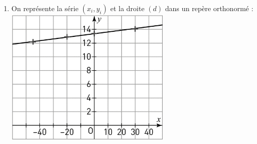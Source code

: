 \documentclass[a4paper,11pt,exos]{nsi} %
\begin{document}
{\begin{enumerate}
        \begin{tabbing}
            $m$\= $=\dfrac{\mathrm{Cov}(x,y)}{\mathrm{Var}(x)}$\\
            \> $=\dfrac{19,0625}{754,6875}$\\
            \> $\approx 0,025$
        \end{tabbing}
        Donc l'équation de la droite $(d)$ d'ajustement affine de la série $(x_i,y_i)$ est :
        \begin{tabbing}
            $y$\= $\approx 0,025(x+8,75)+13,15$\\
            \> $\approx 0,025x+0,21875+13,15$\\
            \> $\approx 0,025x+13,37$
        \end{tabbing}
        \item On représente la série $(x_i,y_i)$ et la droite $(d)$ dans un repère orthonormé :\\[.5em]
        \includegraphics[width=8cm]{Exp232_2Sesamath.png}
    \end{enumerate}
}
\end{document}
